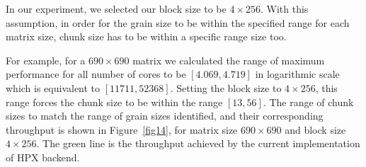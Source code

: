 In our experiment, we selected our block size to be $4\times256$. With this assumption, in order for the grain size to be within the specified range for each matrix size, chunk size has to be within a specific range size too.

For example, for a $690\times690$ matrix we calculated the range of maximum performance for all number of cores to be $[4.069, 4.719]$ in logarithmic scale which is equivalent to $[11711, 52368]$. Setting the block size to $4\times256$, this range forces the chunk size to be within the range $[13,56]$. The range of chunk sizes to match the range of grain sizes identified, and their corresponding throughput is shown in Figure~\ref{fig14}, for matrix size $690\times690$ and block size $4\times256$. The green line is the throughput achieved by the current implementation of HPX backend. 


